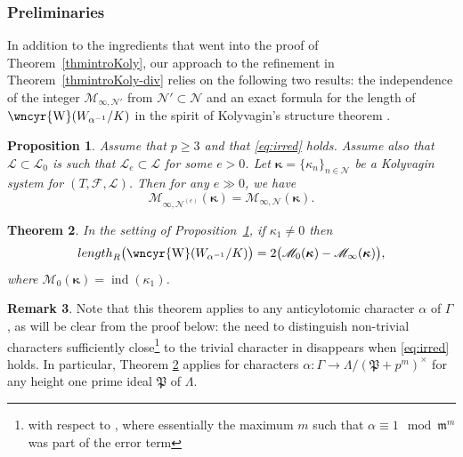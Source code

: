 \documentclass[10pt,reqno]{amsart}
\numberwithin{equation}{section}
\theoremstyle{plain}
\newtheorem{thm}{Theorem}[subsection] %
\theoremstyle{definition}
\newtheorem{rmk}[thm]{Remark}
\theoremstyle{definition}
\theoremstyle{plain}
\newtheorem{prop}[thm]{Proposition}
\theoremstyle{plain}
\theoremstyle{plain}
\theoremstyle{plain}
\theoremstyle{plain}
\theoremstyle{plain}
\newcommand{\ind}{\operatorname{ind}}
\newcommand{\sha}{\text{\wncyr{W}}}
\newcommand{\Fcal}{\mathcal{F}}
\newcommand{\cL}{\mathcal{L}}
\newcommand{\cN}{\mathcal{N}}
\newcommand{\fm}{\mathfrak{m}}
\begin{document}
\subsubsection{Preliminaries}
\label{subsec:prelim-div}
In addition to the ingredients that went into the proof of Theorem~\ref{thmintroKoly}, our approach to the refinement in Theorem~\ref{thmintroKoly-div} relies on the following two results: the independence of the integer $\mathscr{M}_{\infty,\cN'}$ from $\cN'\subset \cN$ and an exact formula for the length of $\sha(W_{\alpha^{-1}}/K)$ in the spirit of Kolyvagin's structure theorem \cite[Thm.~1]{kolystructure}.

\begin{prop}\label{prop:M} Assume that $p\geq 3$ and that \eqref{eq:irred} holds.  Assume also that $\cL\subset\cL_0$ is such that $\cL_e \subset \cL$ for some $e>0$. Let $\boldsymbol{\kappa}=\{\kappa_n\}_{n\in\cN}$ be a Kolyvagin system for $(T,\Fcal,\mathcal{L})$. Then for any $e\gg 0$, we have 
\[
\mathscr{M}_{\infty,\cN^{(e)}}(\boldsymbol{\kappa}) = \mathscr{M}_{\infty,\cN}(\boldsymbol{\kappa}).
\]
\end{prop}



\begin{thm}\label{thm:kol-control}  
In the setting of Proposition~\ref{prop:M}, if $\kappa_1\neq 0$ then
\[
{\rm length}_{R}\bigl(\sha(W_{\alpha^{-1}}/K)\bigr)=2\bigl(\mathscr{M}_0(\boldsymbol{\kappa})-\mathscr{M}_{\infty}(\boldsymbol{\kappa})\bigr),
\]
where $\mathscr{M}_0(\boldsymbol{\kappa})=\ind(\kappa_1)$.
\end{thm}
\begin{rmk}
Note that this 
theorem applies to any anticylotomic character $\alpha$ of $\Gamma$, as will be clear from the proof below: 
the need to distinguish non-trivial characters sufficiently close\footnote{with respect to \cite[Thm. 3.3.8]{eisenstein}, where essentially the maximum $m$ such that $\alpha\equiv 1 \mod \fm^m$ was part of the error term} to the trivial character in \cite[6.1.1]{eisenstein_cyc}  disappears when \eqref{eq:irred} holds. In particular, Theorem \ref{thm:kol-control} applies for characters $\alpha:\Gamma \to \Lambda/(\mathfrak{P}+p^m)^{\times}$ for any height one prime ideal $\mathfrak{P}$ of $\Lambda$. 
\end{rmk}
\end{document}
